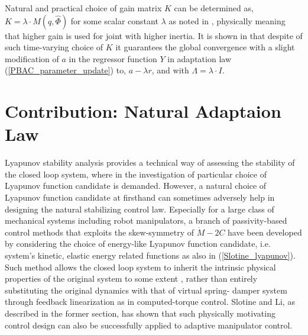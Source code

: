 \documentclass[letterpaper, 10 pt, conference]{ieeeconf}  %
\begin{document}
Natural and practical choice of gain matrix $K$ can be determined as, $K = \lambda\cdot M(q,\hat{\Phi})$ for some scalar constant $\lambda$ as noted in \cite{Slotine_Composite}, physically meaning that higher gain is used for joint with higher inertia. It is shown in \cite{Slotine_Composite} that despite of such time-varying choice of $K$ it guarantees the global convergence with a slight modification of $a$ in the regressor function $Y$ in adaptation law (\ref{PBAC_parameter_update}) to, $a-\lambda r$, and with $\Lambda = \lambda \cdot I$.

\section{Contribution: Natural Adaptaion Law}
Lyapunov stability analysis provides a technical way of assessing the stability of the closed loop system, where in the investigation of particular choice of Lyapunov function candidate is demanded. However, a natural choice of Lyapunov function candidate at firsthand can sometimes adversely help in designing the natural stabilizing control law. Especially for a large class of mechanical systems including robot manipulators, a branch of passivity-based control methods that exploits the skew-symmetry of $\dot{M} - 2C$ have been developed by considering the choice of energy-like Lyapunov function candidate, i.e. system's kinetic, elastic energy related functions as also in (\ref{Slotine_lyapunov}). Such method allows the closed loop system to inherit the intrinsic physical properties of the original system to some extent \cite{Slotine_Magazine}, rather than entirely substituting the original dynamics with that of virtual spring- damper system through feedback linearization as in computed-torque control. Slotine and Li, as described in the former section, has shown that such physically motivating control design can also be successfully applied to adaptive manipulator control.
\end{document}
